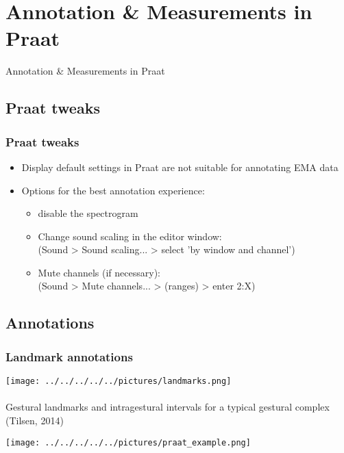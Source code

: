 \documentclass[12pt,a4paper]{beamer}
\begin{document}
\section{Annotation \& Measurements in Praat}
\begin{frame}
    \centering
    {\LARGE Annotation \& Measurements in Praat}
\end{frame}

\subsection{Praat tweaks}
\begin{frame}
    \frametitle{Praat tweaks}
    \begin{itemize}
        \item Display default settings in Praat are not suitable for annotating EMA data
        \item Options for the best annotation experience:
        \begin{itemize}
            \item disable the spectrogram
            \item Change sound scaling in the editor window: \\
            (Sound > Sound scaling... > select 'by window and channel')
            \item Mute channels (if necessary):\\
            (Sound > Mute channels... > (ranges) > enter 2:X)
        \end{itemize}
    \end{itemize}
\end{frame}

\subsection{Annotations}
\begin{frame}
    \frametitle{Landmark annotations}
    \centering
    \texttt{[image: ../../../../../pictures/landmarks.png]}\\
    \\
    {\scriptsize Gestural landmarks and intragestural intervals for a typical gestural complex (Tilsen, 2014)}
\end{frame}

\begin{frame}
    \centering
    \texttt{[image: ../../../../../pictures/praat\_example.png]}\\
\end{frame}
\end{document}

